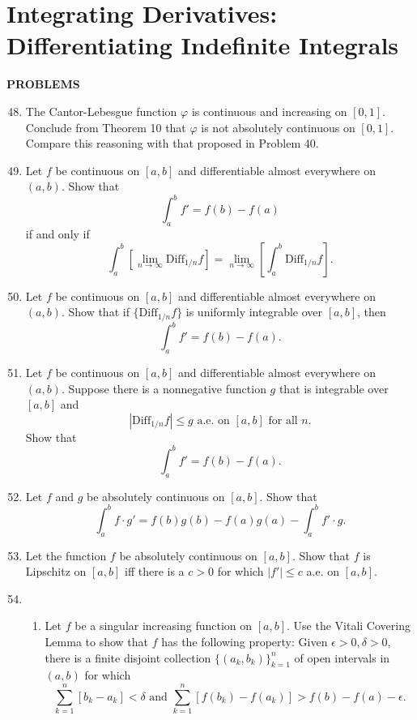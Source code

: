 \section{Integrating Derivatives: Differentiating Indefinite Integrals}

\begin{center}
	\textbf{PROBLEMS}
\end{center}
\begin{enumerate}
	\setcounter{enumi}{47}
    \item The Cantor-Lebesgue function $\varphi$ is continuous and increasing on $[0,1]$. Conclude from Theorem 10 that $\varphi$ is not absolutely continuous on $[0,1]$.
    Compare this reasoning with that proposed in Problem 40.
    \item Let $f$ be continuous on $[a,b]$ and differentiable almost everywhere on $(a,b)$. Show that 
    \[
        \int_a^bf'=f(b)-f(a)  
    \]
    if and only if 
    \[
        \int_a^b[\lim_{n\to\infty}\text{Diff}_{1/n}f]=\lim_{n\to\infty}[\int_a^b\text{Diff}_{1/n}f].
    \]
    \item Let $f$ be continuous on $[a,b]$ and differentiable almost everywhere on $(a,b)$. Show that if $\{\text{Diff}_{1/n}f\}$ is uniformly integrable over $[a,b]$, then
    \[
        \int_a^bf'=f(b)-f(a).  
    \]
    \item Let $f$ be continuous on $[a,b]$ and differentiable almost everywhere on $(a,b)$. Suppose there is a nonnegative function $g$ that is integrable over $[a,b]$ and 
    \[
        |\text{Diff}_{1/n}f|\le g\text{ a.e. on }[a,b]\text{ for all }n.  
    \]
    Show that 
    \[
        \int_a^bf'=f(b)-f(a).  
    \]
    \item Let $f$ and $g$ be absolutely continuous on $[a,b]$. Show that
    \[
        \int_a^bf\cdot g'=f(b)g(b)-f(a)g(a)-\int_a^bf'\cdot g.  
    \] 
    \item Let the function $f$ be absolutely continuous on $[a,b]$. Show that $f$ is Lipschitz on $[a,b]$ iff there is a $c>0$ for which $|f'|\le c$ a.e. on $[a,b]$.
    \item 
    \begin{enumerate}[label=(\roman*),align=left]
        \item Let $f$ be a singular increasing function on $[a,b]$. Use the Vitali Covering Lemma to show that $f$ has the following property: Given $\epsilon>0,\delta>0$, there is a finite disjoint collection $\{(a_k,b_k)\}_{k=1}^n$ of open intervals in $(a,b)$ for which
        \[
            \sum_{k=1}^n[b_k-a_k]<\delta\text{ and }\sum_{k=1}^n[f(b_k)-f(a_k)]>f(b)-f(a)-\epsilon.  
\]
\end{enumerate}
\end{enumerate}
